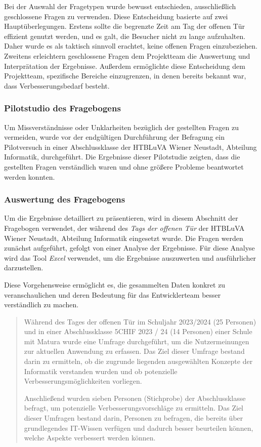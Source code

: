 Bei der Auswahl der Fragetypen wurde bewusst entschieden, ausschließlich geschlossene Fragen zu verwenden. Diese Entscheidung
basierte auf zwei Hauptüberlegungen. Erstens sollte die begrenzte Zeit am Tag der offenen Tür effizient genutzt werden,
und es galt, die Besucher nicht zu lange aufzuhalten. Daher wurde es als taktisch sinnvoll erachtet, keine offenen Fragen
einzubeziehen. Zweitens erleichtern geschlossene Fragen dem Projektteam die Auswertung und Interprätation der Ergebnisse.
Außerdem ermöglichte diese Entscheidung dem Projektteam, spezifische Bereiche einzugrenzen, in denen bereits bekannt war,
dass Verbesserungsbedarf besteht.

\subsubsection{Pilotstudio des Fragebogens}
Um Missverständnisse oder Unklarheiten bezüglich der gestellten Fragen zu vermeiden, wurde vor der endgültigen Durchführung
der Befragung ein Pilotversuch in einer Abschlussklasse der HTBLuVA Wiener Neustadt, Abteilung Informatik, durchgeführt.
Die Ergebnisse dieser Pilotstudie zeigten, dass die gestellten Fragen verständlich waren und ohne größere Probleme beantwortet
werden konnten.

\subsubsection{Auswertung des Fragebogens}
Um die Ergebnisse detailliert zu präsentieren, wird in diesem Abschnitt der Fragebogen verwendet, der während des
\textit{Tags der offenen Tür} der HTBLuVA Wiener Neustadt, Abteilung Informatik eingesetzt wurde. Die Fragen werden zunächst
aufgeführt, gefolgt von einer Analyse der Ergebnisse. Für diese Analyse wird das Tool \textit{Excel} verwendet, um die
Ergebnisse auszuwerten und ausführlicher darzustellen.

Diese Vorgehensweise ermöglicht es, die gesammelten Daten konkret zu veranschaulichen und deren Bedeutung für das Entwicklerteam
besser verständlich zu machen.

\begin{quote}
    Während des Tages der offenen Tür im Schuljahr 2023/2024 (25 Personen) und in einer Abschlussklasse 5CHIF 2023 / 24 (14 Personen)
    einer Schule mit Matura wurde eine Umfrage durchgeführt, um die Nutzermeinungen zur aktuellen Anwendung zu erfassen.
    Das Ziel dieser Umfrage bestand darin zu ermitteln, ob die zugrunde liegenden ausgewählten Konzepte der Informatik verstanden wurden und ob
    potenzielle Verbesserungsmöglichkeiten vorliegen.

    Anschließend wurden sieben Personen (Stichprobe) der Abschlussklasse befragt, um potenzielle Verbesserungsvorschläge
    zu ermitteln. Das Ziel dieser Umfragen bestand darin, Personen zu befragen, die bereits über grundlegendes IT-Wissen
    verfügen und dadurch besser beurteilen können, welche Aspekte verbessert werden können.
\end{quote}

